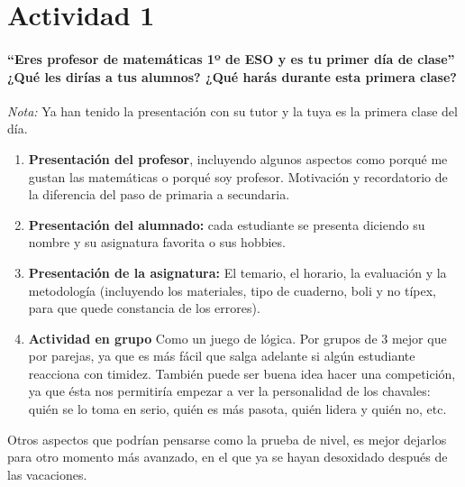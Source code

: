 \section{Actividad 1}


\paragraph{“Eres profesor de matemáticas 1º de ESO y es tu primer día de clase”
¿Qué les dirías a tus alumnos? ¿Qué harás durante esta primera clase?}

\textit{Nota:} Ya han tenido la presentación con su tutor y la tuya es la primera clase del día.


\begin{enumerate}
\item 	\textbf{Presentación del profesor}, incluyendo algunos aspectos como porqué me gustan las matemáticas o porqué soy profesor. 
\subitem Motivación y recordatorio de la diferencia del paso de primaria a secundaria.
\item \textbf{Presentación del alumnado:} cada estudiante se presenta diciendo su nombre y su asignatura favorita o sus hobbies.
\item \textbf{Presentación de la asignatura:} El temario, el horario, la evaluación y la metodología (incluyendo los materiales, tipo de cuaderno, boli y no típex, para que quede constancia de los errores).
\item \textbf{Actividad en grupo} Como un juego de lógica. Por grupos de 3 mejor que por parejas, ya que es más fácil que salga adelante si algún estudiante reacciona con timidez.
\subitem También puede ser buena idea hacer una competición, ya que ésta nos permitiría empezar a ver la personalidad de los chavales: quién se lo toma en serio, quién es más pasota, quién lidera y quién no, etc.
\end{enumerate}

Otros aspectos que podrían pensarse como la prueba de nivel, es mejor dejarlos para otro momento más avanzado, en el que ya se hayan desoxidado después de las vacaciones.

